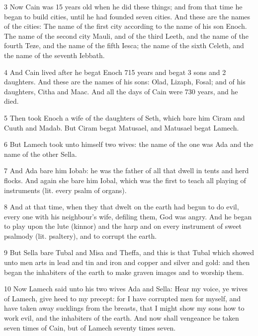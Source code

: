 \par 3 Now Cain was 15 years old when he did these things; and from that time he began to build cities, until he had founded seven cities. And these are the names of the cities: The name of the first city according to the name of his son Enoch. The name of the second city Mauli, and of the third Leeth, and the name of the fourth Teze, and the name of the fifth Iesca; the name of the sixth Celeth, and the name of the seventh Iebbath.

\par 4 And Cain lived after he begat Enoch 715 years and begat 3 sons and 2 daughters. And these are the names of his sons: Olad, Lizaph, Fosal; and of his daughters, Citha and Maac. And all the days of Cain were 730 years, and he died.

\par 5 Then took Enoch a wife of the daughters of Seth, which bare him Ciram and Cuuth and Madab. But Ciram begat Matusael, and Matusael begat Lamech.

\par 6 But Lamech took unto himself two wives: the name of the one was Ada and the name of the other Sella. 

\par 7 And Ada bare him Iobab: he was the father of all that dwell in tents and herd flocks. And again she bare him Iobal, which was the first to teach all playing of instruments (lit. every psalm of organs). 

\par 8 And at that time, when they that dwelt on the earth had begun to do evil, every one with his neighbour's wife, defiling them, God was angry. And he began to play upon the lute (kinnor) and the harp and on every instrument of sweet psalmody (lit. psaltery), and to corrupt the earth.

\par 9 But Sella bare Tubal and Misa and Theffa, and this is that Tubal which showed unto men arts in lead and tin and iron and copper and silver and gold: and then began the inhabiters of the earth to make graven images and to worship them.

\par 10 Now Lamech said unto his two wives Ada and Sella: Hear my voice, ye wives of Lamech, give heed to my precept: for I have corrupted men for myself, and have taken away sucklings from the breasts, that I might show my sons how to work evil, and the inhabiters of the earth. And now shall vengeance be taken seven times of Cain, but of Lamech seventy times seven.

